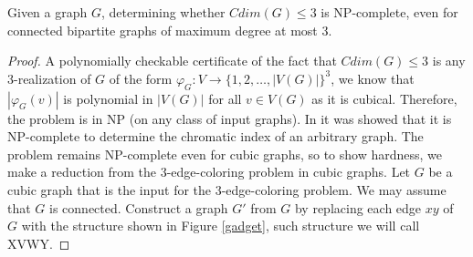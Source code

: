 \documentclass[12pt,a4paper,titlepage,openany]{report}
\begin{document}
\begin{theorem}
Given a graph $G$, determining whether $Cdim(G) \leq 3$ is NP-complete, even for connected bipartite graphs of maximum degree at most 3.
\end{theorem}
\begin{proof}
A polynomially checkable certificate of the fact that $Cdim(G) \leq 3$ is any 3-realization of $G$ of the form $\varphi _G : V \to \{1,2,\ldots, |V(G)|\}^3$, we know that $|\varphi_G(v)|$ is polynomial in $|V(G)|$ for all $v\in V(G)$ as it is cubical. Therefore, the problem is in NP (on any class of input graphs).\newline
In \cite{Ian} it was showed that it is NP-complete to determine the chromatic index of an arbitrary graph. The problem remains NP-complete even for cubic graphs, so to show hardness, we make a reduction from the 3-edge-coloring problem in cubic graphs.\newline
Let $G$ be a cubic graph that is the input for the
3-edge-coloring problem. We may assume that $G$ is connected. Construct a graph $G'$ from $G$ by replacing each edge $xy$ of $G$ with the structure shown in Figure \ref{gadget}, such structure we will call XVWY.


\end{proof}
\end{document}
